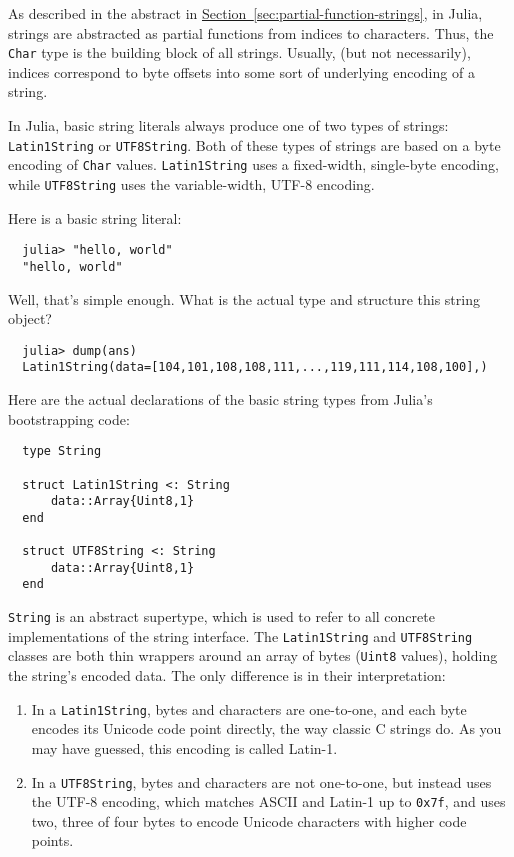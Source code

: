 \documentclass{article}
\newcommand{\Section}[1]{\hyperref[sec:#1]{Section~\ref*{sec:#1}}}
\begin{document}
As described in the abstract in \Section{partial-function-strings}, in Julia, strings are abstracted as partial functions from indices to characters.
Thus, the \verb|Char| type is the building block of all strings.
Usually, (but not necessarily), indices correspond to byte offsets into some sort of underlying encoding of a string.

In Julia, basic string literals always produce one of two types of strings:
\verb|Latin1String| or \verb|UTF8String|.
Both of these types of strings are based on a byte encoding of \verb|Char| values.
\verb|Latin1String| uses a fixed-width, single-byte encoding, while \verb|UTF8String| uses the variable-width, UTF-8 encoding.

Here is a basic string literal:
\begin{verbatim}
  julia> "hello, world"
  "hello, world"
\end{verbatim}
Well, that's simple enough.
What is the actual type and structure this string object?
\begin{verbatim}
  julia> dump(ans)
  Latin1String(data=[104,101,108,108,111,...,119,111,114,108,100],)
\end{verbatim}
Here are the actual declarations of the basic string types from Julia's bootstrapping code:
\begin{verbatim}
  type String

  struct Latin1String <: String
      data::Array{Uint8,1}
  end

  struct UTF8String <: String
      data::Array{Uint8,1}
  end
\end{verbatim}
\verb|String| is an abstract supertype, which is used to refer to all concrete implementations of the string interface.
The \verb|Latin1String| and \verb|UTF8String| classes are both thin wrappers around an array of bytes (\verb|Uint8| values), holding the string's encoded data.
The only difference is in their interpretation:
\begin{enumerate}
\item In a \verb|Latin1String|, bytes and characters are one-to-one, and each byte encodes its Unicode code point directly, the way classic C strings do.
As you may have guessed, this encoding is called Latin-1.
\item In a \verb|UTF8String|, bytes and characters are not one-to-one, but instead uses the UTF-8 encoding, which matches ASCII and Latin-1 up to \verb|0x7f|, and uses two, three of four bytes to encode Unicode characters with higher code points.
\end{enumerate}
\end{document}
